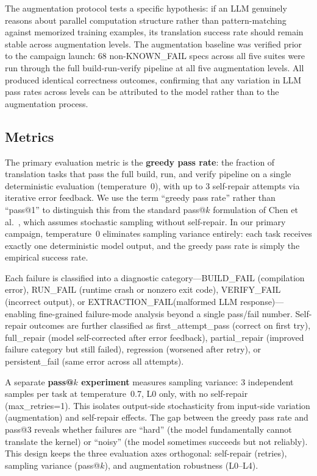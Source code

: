 \documentclass{article}
\newcommand{\buildfail}{\textsc{BUILD\_FAIL}}
\newcommand{\runfail}{\textsc{RUN\_FAIL}}
\newcommand{\verifyfail}{\textsc{VERIFY\_FAIL}}
\newcommand{\extractionfail}{\textsc{EXTRACTION\_FAIL}}
\begin{document}
The augmentation protocol tests a specific hypothesis: if an LLM genuinely reasons about parallel computation structure rather than pattern-matching against memorized training examples, its translation success rate should remain stable across augmentation levels. The augmentation baseline was verified prior to the campaign launch: 68 non-KNOWN\_FAIL specs across all five suites were run through the full build-run-verify pipeline at all five augmentation levels. All produced identical correctness outcomes, confirming that any variation in LLM pass rates across levels can be attributed to the model rather than to the augmentation process.

\subsection{Metrics}
\label{sec:metrics}

The primary evaluation metric is the \textbf{greedy pass rate}: the fraction of translation tasks that pass the full build, run, and verify pipeline on a single deterministic evaluation (temperature~0), with up to 3 self-repair attempts via iterative error feedback. We use the term ``greedy pass rate'' rather than ``pass@1'' to distinguish this from the standard pass@$k$ formulation of Chen et al.~\cite{HumanEval2021}, which assumes stochastic sampling without self-repair. In our primary campaign, temperature~0 eliminates sampling variance entirely: each task receives exactly one deterministic model output, and the greedy pass rate is simply the empirical success rate.

Each failure is classified into a diagnostic category---\buildfail{} (compilation error), \runfail{} (runtime crash or nonzero exit code), \verifyfail{} (incorrect output), or \extractionfail (malformed LLM response)---enabling fine-grained failure-mode analysis beyond a single pass/fail number. Self-repair outcomes are further classified as first\_attempt\_pass (correct on first try), full\_repair (model self-corrected after error feedback), partial\_repair (improved failure category but still failed), regression (worsened after retry), or persistent\_fail (same error across all attempts).

A separate \textbf{pass@$k$ experiment} measures sampling variance: 3 independent samples per task at temperature~0.7, L0 only, with no self-repair (max\_retries=1). This isolates output-side stochasticity from input-side variation (augmentation) and self-repair effects. The gap between the greedy pass rate and pass@3 reveals whether failures are ``hard'' (the model fundamentally cannot translate the kernel) or ``noisy'' (the model sometimes succeeds but not reliably). This design keeps the three evaluation axes orthogonal: self-repair (retries), sampling variance (pass@$k$), and augmentation robustness (L0--L4).
\end{document}
